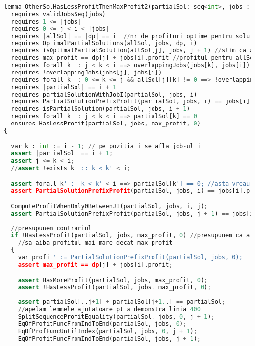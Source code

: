 \begin{lstlisting}[language=Python]
lemma OtherSolHasLessProfitThenMaxProfit2(partialSol: seq<int>, jobs : seq<Job>, i: int, j : int, max_profit : int, allSol : seq<seq<int>>, dp: seq<int>)
  requires validJobsSeq(jobs)
  requires 1 <= |jobs|
  requires 0 <= j < i < |jobs|
  requires |allSol| == |dp| == i  //nr de profituri optime pentru solutiile partiale optime din fata lui este egal i
  requires OptimalPartialSolutions(allSol, jobs, dp, i)
  requires isOptimalPartialSolution(allSol[j], jobs, j + 1) //stim ca allSol[j] este solutia partiala optima pana la pozitia j si are profitul pozotiv dp[j]
  requires max_profit == dp[j] + jobs[i].profit //profitul pentru allSol[j] si profitul pentru job-ul i
  requires forall k :: j < k < i ==> overlappingJobs(jobs[k], jobs[i])
  requires !overlappingJobs(jobs[j], jobs[i])
  requires forall k :: 0 <= k <= j && allSol[j][k] != 0 ==> !overlappingJobs(jobs[k], jobs[i]) //allSol[1] are 2 elemente pe poz 0 si 1
  requires |partialSol| == i + 1
  requires partialSolutionWithJobI(partialSol, jobs, i)
  requires PartialSolutionPrefixProfit(partialSol, jobs, i) == jobs[i].profit;
  requires isPartialSolution(partialSol, jobs, i + 1)
  requires forall k :: j < k < i ==> partialSol[k] == 0
  ensures HasLessProfit(partialSol, jobs, max_profit, 0)
{

  var k : int := i - 1; // pe pozitia i se afla job-ul i
  assert |partialSol| == i + 1;
  assert j <= k < i;
  //assert !exists k' :: k < k' < i;

  assert forall k' :: k < k' < i ==> partialSol[k'] == 0; //asta vreau sa demonstrez ==> ca am doar 0 -rouri pe pozitiile i - 1 ...0
  assert PartialSolutionPrefixProfit(partialSol, jobs, i) == jobs[i].profit;

  ComputeProfitWhenOnly0BetweenJI(partialSol, jobs, i, j);
  assert PartialSolutionPrefixProfit(partialSol, jobs, j + 1) == jobs[i].profit;
  
  //presupunem contrariul
  if !HasLessProfit(partialSol, jobs, max_profit, 0) //presupunem ca ar exista o solutie partiala care indeplineste conditiile si care
    //sa aiba profitul mai mare decat max_profit
  {
    var profit' := PartialSolutionPrefixProfit(partialSol, jobs, 0);
    assert max_profit == dp[j] + jobs[i].profit;

    assert HasMoreProfit(partialSol, jobs, max_profit, 0);
    assert !HasLessProfit(partialSol, jobs, max_profit, 0);
    
    assert partialSol[..j+1] + partialSol[j+1..] == partialSol;
    //apelam lemmele ajutatoare pt a demonstra linia 400
    SplitSequenceProfitEquality(partialSol, jobs, 0, j + 1);
    EqOfProfitFuncFromIndToEnd(partialSol, jobs, 0);
    EqOfProfFuncUntilIndex(partialSol, jobs, 0, j + 1);
    EqOfProfitFuncFromIndToEnd(partialSol, jobs, j + 1);
  

\end{lstlisting}
